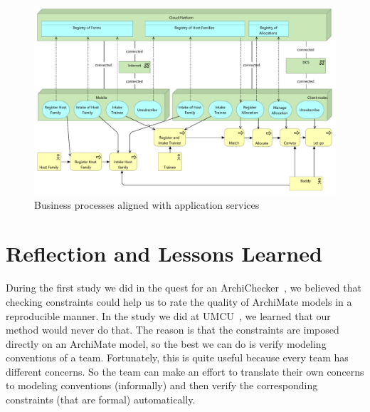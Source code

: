 \documentclass[sn-vancouver]{sn-jnl}%
\theoremstyle{thmstyleone}%
\theoremstyle{thmstyletwo}%
\theoremstyle{thmstylethree}%
\begin{document}
\begin{figure}[hbtp]
 \centering
\includegraphics[clip=true, scale=0.48]{Services 3.pdf}
\caption{Business processes aligned with application services}
\label{fig: Alignment of services with business processes 3}
\end{figure}

\section{Reflection and Lessons Learned}\label{reflection}
During the first study we did in the quest for an ArchiChecker~\cite{filetenterprise},
we believed that checking constraints could help us to rate the quality of ArchiMate models in a reproducible manner.
In the study we did at UMCU~\cite{iceis22}, we learned that our method would never do that.
The reason is that the constraints are imposed directly on an ArchiMate model, so the best we can do is verify modeling conventions of a team.
Fortunately, this is quite useful because every team has different concerns.
So the team can make an effort to translate their own concerns to modeling conventions (informally)
and then verify the corresponding constraints (that are formal) automatically.
\end{document}
